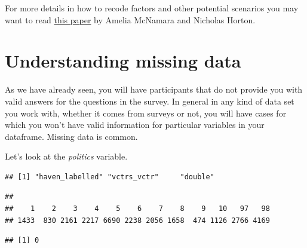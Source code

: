\documentclass[
]{book}
\newenvironment{Shaded}{\begin{snugshade}}{\end{snugshade}}
\newcommand{\FunctionTok}[1]{\textcolor[rgb]{0.00,0.00,0.00}{#1}}
\newcommand{\NormalTok}[1]{#1}
\newcommand{\SpecialCharTok}[1]{\textcolor[rgb]{0.00,0.00,0.00}{#1}}
\begin{document}
For more details in how to recode factors and other potential scenarios you may want to read \href{https://peerj.com/preprints/3163/}{this paper} by Amelia McNamara and Nicholas Horton.

\hypertarget{understanding-missing-data}{%
\section{Understanding missing data}\label{understanding-missing-data}}

As we have already seen, you will have participants that do not provide you with valid answers for the questions in the survey. In general in any kind of data set you work with, whether it comes from surveys or not, you will have cases for which you won't have valid information for particular variables in your dataframe. Missing data is common.

Let's look at the \emph{politics} variable.

\begin{Shaded}
\end{Shaded}

\begin{verbatim}
## [1] "haven_labelled" "vctrs_vctr"     "double"
\end{verbatim}

\begin{Shaded}
\end{Shaded}

\begin{verbatim}
## 
##    1    2    3    4    5    6    7    8    9   10   97   98 
## 1433  830 2161 2217 6690 2238 2056 1658  474 1126 2766 4169
\end{verbatim}

\begin{Shaded}
\end{Shaded}

\begin{verbatim}
## [1] 0
\end{verbatim}
\end{document}
